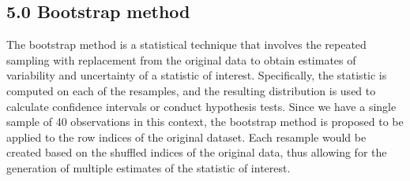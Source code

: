 \documentclass[
]{article}
\newenvironment{Shaded}{\begin{snugshade}}{\end{snugshade}}
\newcommand{\DecValTok}[1]{\textcolor[rgb]{0.00,0.00,0.81}{#1}}
\newcommand{\FloatTok}[1]{\textcolor[rgb]{0.00,0.00,0.81}{#1}}
\newcommand{\FunctionTok}[1]{\textcolor[rgb]{0.00,0.00,0.00}{#1}}
\newcommand{\NormalTok}[1]{#1}
\newcommand{\OtherTok}[1]{\textcolor[rgb]{0.56,0.35,0.01}{#1}}
\newcommand{\SpecialCharTok}[1]{\textcolor[rgb]{0.00,0.00,0.00}{#1}}
\begin{document}
\begin{Shaded}
\end{Shaded}

\hypertarget{bootstrap-method}{%
\subsection{5.0 Bootstrap method}\label{bootstrap-method}}

The bootstrap method is a statistical technique that involves the
repeated sampling with replacement from the original data to obtain
estimates of variability and uncertainty of a statistic of interest.
Specifically, the statistic is computed on each of the resamples, and
the resulting distribution is used to calculate confidence intervals or
conduct hypothesis tests. Since we have a single sample of 40
observations in this context, the bootstrap method is proposed to be
applied to the row indices of the original dataset. Each resample would
be created based on the shuffled indices of the original data, thus
allowing for the generation of multiple estimates of the statistic of
interest.
\end{document}
